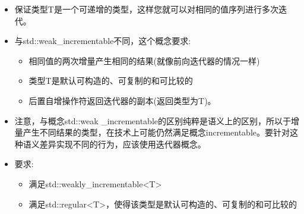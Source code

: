 \begin{itemize}
\item
保证类型T是一个可递增的类型，这样您就可以对相同的值序列进行多次迭代。

\item
与std::weak\_incrementable不同，这个概念要求:

\begin{itemize}
\item
相同值的两次增量产生相同的结果(就像前向迭代器的情况一样)

\item
类型T是默认可构造的、可复制的和可比较的

\item
后置自增操作符返回迭代器的副本(返回类型为T)。
\end{itemize}

\item
注意，与概念std::weak \_incrementable的区别纯粹是语义上的区别，所以于增量产生不同结果的类型，在技术上可能仍然满足概念incrementable。要针对这种语义差异实现不同的行为，应该使用迭代器概念。

\item
要求:
\begin{itemize}
\item
满足std::weakly\_incrementable<T>

\item
满足std::regular<T>，使得该类型是默认可构造的、可复制的和可比较的
\end{itemize}
\end{itemize}
